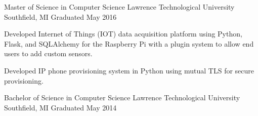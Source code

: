 \documentclass[11pt, a4paper]{awesome-cv}
\begin{document}
\begin{cventries}
    \cventry
    {Master of Science in Computer Science}
    {Lawrence Technological University}
    {Southfield, MI}
    {Graduated May 2016}
    {
        \begin{cvitems}
            \item{Developed Internet of Things (IOT) data acquisition platform using Python, Flask, and SQLAlchemy for the Raspberry Pi with a plugin system to allow end users to add custom 
                  sensors.}
            \item{Developed IP phone provisioning system in Python using mutual TLS for secure provisioning.}
        \end{cvitems}
    }
    
    \cventry
    {Bachelor of Science in Computer Science}
    {Lawrence Technological University}
    {Southfield, MI}
    {Graduated May 2014}
    {}
\end{cventries}

\vspace{-\baselineskip}


\vspace{2.0mm}

\end{document}
